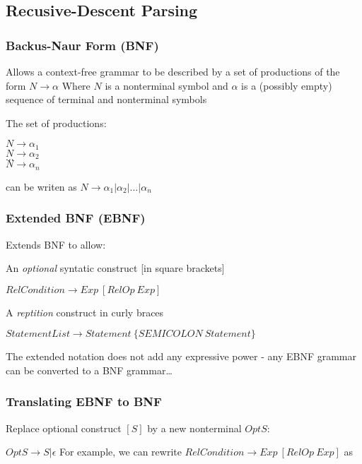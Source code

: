\subsection{Recusive-Descent Parsing}
\subsubsection{Backus-Naur Form (BNF)}
Allows a context-free grammar to be described by a set of productions of the form
$N \rightarrow \alpha$
Where $N$ is a nonterminal symbol and $\alpha$ is a (possibly empty) sequence of terminal and nonterminal symbols

The set of productions:

$N \rightarrow \alpha_1$ \\
$N \rightarrow \alpha_2$ \\
$\ldots$ \\[0.1cm]
$N \rightarrow \alpha_n$

can be writen as
$N \rightarrow \alpha_1 | \alpha_2 | \ldots | \alpha_n$

\subsubsection{Extended BNF (EBNF)}
Extends BNF to allow:

An \emph{optional} syntatic construct [in square brackets]

$RelCondition \rightarrow Exp \ [RelOp \ Exp]$ \newline

A \emph{reptition} construct {in curly braces}\newline

$StatementList \rightarrow Statement \ \{SEMICOLON \ Statement \}$ \newline


The extended notation does not add any expressive power - any EBNF grammar can be converted to a BNF grammar\dots

\subsubsection{Translating EBNF to BNF}

Replace optional construct $[S]$ by a new nonterminal $OptS$:

$OptS \rightarrow S | \epsilon$ \newline
For example, we can rewrite
$RelCondition \rightarrow Exp \ [RelOp \ Exp]$ \newline
as


